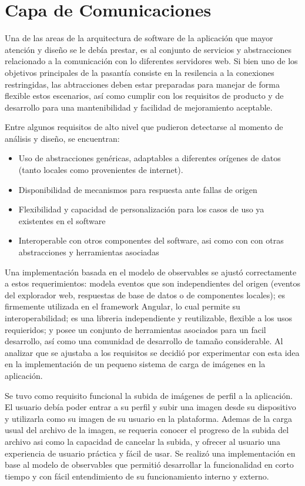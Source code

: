 \section{Capa de Comunicaciones}

Una de las areas de la arquitectura de software de la aplicación que mayor atención y diseño se le debía prestar, es al conjunto de servicios y abstracciones relacionado a la comunicación con lo diferentes servidores web. Si bien uno de los objetivos principales de la pasantía consiste en la resilencia a la conexiones restringidas, las abtracciones deben estar preparadas para manejar de forma flexible estos escenarios, así como cumplir con los requisitos de producto y de desarrollo para una mantenibilidad y facilidad de mejoramiento aceptable.

Entre algunos requisitos de alto nivel que pudieron detectarse al momento de análisis y diseño, se encuentran:

\begin{itemize}
  \item Uso de abstracciones genéricas, adaptables a diferentes orígenes de datos (tanto locales como provenientes de internet).
  \item Disponibilidad de mecanismos para respuesta ante fallas de origen
  \item Flexibilidad y capacidad de personalización para los casos de uso ya existentes en el software
  \item Interoperable con otros componentes del software, asi como con con otras abstracciones y herramientas asociadas
\end{itemize}

Una implementación basada en el modelo de observables se ajustó correctamente a estos requerimientos: modela eventos que son independientes del origen (eventos del explorador web, respuestas de base de datos o de componentes locales); es firmemente utilizada en el framework Angular, lo cual permite su interoperabilidad; es una libreria independiente y reutilizable, flexible a los usos requieridos; y posee un conjunto de herramientas asociados para un facil desarrollo, así como una comunidad de desarrollo de tamaño considerable. Al analizar que se ajustaba a los requisitos se decidió por experimentar con esta idea en la implementación de un pequeno sistema de carga de imágenes en la aplicación.

Se tuvo como requisito funcional la subida de imágenes de perfil a la aplicación. El usuario debía poder entrar a su perfil y subir una imagen desde su dispositivo y utilizarla como su imagen de su usuario en la plataforma. Ademas de la carga usual del archivo de la imagen, se requeria conocer el progreso de la subida del archivo asi como la capacidad de cancelar la subida, y ofrecer al usuario una experiencia de usuario práctica y fácil de usar. Se realizó una implementación en base al modelo de observables que permitió desarrollar la funcionalidad en corto tiempo y con fácil entendimiento de su funcionamiento interno y externo.


